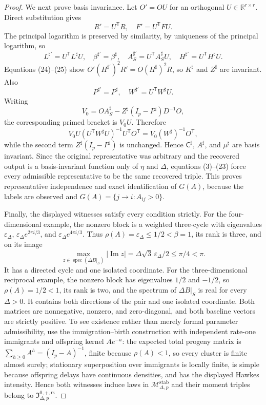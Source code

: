 \documentclass{article}
\begin{document}
\begin{proof}
We next prove basis invariance.  Let \(O'=OU\) for an orthogonal \(U\in\mathbb R^{r\times r}\).  Direct substitution gives
\[
 R'=U^{\mathsf T}R,\quad F'=U^{\mathsf T}FU.
\tag{24}
\]
The principal logarithm is preserved by similarity, by uniqueness of the principal logarithm, so
\[
 L^{\sharp\prime}=U^{\mathsf T}L^\sharp U,\quad
 \beta^{\sharp\prime}=\beta^\sharp,\quad
 A_S^{\sharp\prime}=U^{\mathsf T}A_S^\sharp U,\quad
 H^{\sharp\prime}=U^{\mathsf T}H^\sharp U.
\tag{25}
\]
Equations (24)--(25) show \(O'(H^{\sharp\prime})^2R'=O(H^\sharp)^2R\), so \(K^\sharp\) and \(Z^\sharp\) are invariant.  Also
\[
 P^{\sharp\prime}=P^\sharp,\quad
 W^{\sharp\prime}=U^{\mathsf T}W^\sharp U.
\tag{26}
\]
Writing
\[
 V_0=OA_S^\sharp-Z^\sharp(I_p-P^\sharp)D^{-1}O,
\]
the corresponding primed bracket is \(V_0U\).  Therefore
\[
 V_0U(U^{\mathsf T}W^\sharp U)^{-1}U^{\mathsf T}O^{\mathsf T}
 =V_0(W^\sharp)^{-1}O^{\mathsf T},
\]
while the second term \(Z^\sharp(I_p-P^\sharp)\) is unchanged.  Hence \(\mathsf C^\sharp\), \(A^\sharp\), and \(\mu^\sharp\) are basis invariant.  Since the original representative was arbitrary and the recovered output is a basis-invariant function only of \(\eta\) and \(\Delta\), equations (3)--(23) force every admissible representative to be the same recovered triple.  This proves representative independence and exact identification of \(G(A)\), because the labels are observed and \(G(A)=\{j\to i:A_{ij}>0\}\).

Finally, the displayed witnesses satisfy every condition strictly.  For the four-dimensional example, the nonzero block is a weighted three-cycle with eigenvalues \(\varepsilon_\Delta\), \(\varepsilon_\Delta e^{2\pi i/3}\), and \(\varepsilon_\Delta e^{4\pi i/3}\).  Thus \(\rho(A)=\varepsilon_\Delta\leq1/2<\beta=1\), its rank is three, and on its image
\[
 \max_{z\in\operatorname{spec}(\Delta B|_S)}|\operatorname{Im}z|
 =\Delta\sqrt3\,\varepsilon_\Delta/2\leq\pi/4<\pi.
\]
It has a directed cycle and one isolated coordinate.  For the three-dimensional reciprocal example, the nonzero block has eigenvalues \(1/2\) and \(-1/2\), so \(\rho(A)=1/2<1\), its rank is two, and the spectrum of \(\Delta B|_S\) is real for every \(\Delta>0\).  It contains both directions of the pair and one isolated coordinate.  Both matrices are nonnegative, nonzero, and zero-diagonal, and both baseline vectors are strictly positive.  To see existence rather than merely formal parameter admissibility, use the immigration--birth construction with independent rate-one immigrants and offspring kernel \(Ae^{-u}\): the expected total progeny matrix is \(\sum_{h\geq0}A^h=(I_p-A)^{-1}\), finite because \(\rho(A)<1\), so every cluster is finite almost surely; stationary superposition over immigrants is locally finite, is simple because offspring delays have continuous densities, and has the displayed Hawkes intensity.  Hence both witnesses induce laws in \(\mathcal M_{\Delta,p}^{\mathrm{stab}}\) and their moment triples belong to \(\mathfrak I_{\Delta,p}^{0,+,\mathrm{rs}}\).
\end{proof}
\end{document}

